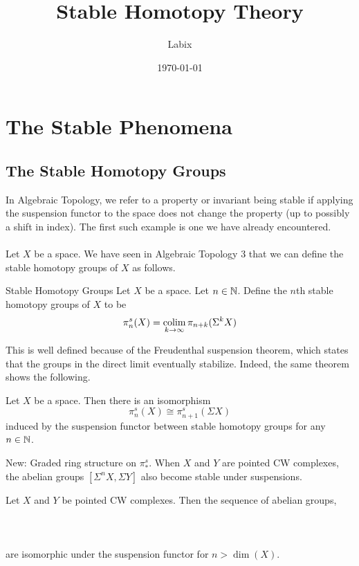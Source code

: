 \documentclass[a4paper]{article}
\title{Stable Homotopy Theory}
\author{Labix}
\date{\today}
\begin{document}
\maketitle
\begin{abstract}
\begin{itemize}
\end{itemize}
\end{abstract}
\pagebreak
\tableofcontents

\pagebreak
\section{The Stable Phenomena}
\subsection{The Stable Homotopy Groups}
In Algebraic Topology, we refer to a property or invariant being stable if applying the suspension functor to the space does not change the property (up to possibly a shift in index). The first such example is one we have already encountered. \\~\\

Let $X$ be a space. We have seen in Algebraic Topology 3 that we can define the stable homotopy groups of $X$ as follows. 

\begin{defn}{Stable Homotopy Groups}{} Let $X$ be a space. Let $n\in\mathbb{N}$. Define the $n$th stable homotopy groups of $X$ to be $$\pi_n^s(X)=\operatorname*{colim}_{k\to\infty}\pi_{n+k}(\Sigma^kX)$$
\end{defn}

This is well defined because of the Freudenthal suspension theorem, which states that the groups in the direct limit eventually stabilize. Indeed, the same theorem shows the following. 

\begin{prp}{}{} Let $X$ be a space. Then there is an isomorphism $$\pi_n^s(X)\cong\pi_{n+1}^s(\Sigma X)$$ induced by the suspension functor between stable homotopy groups for any $n\in\mathbb{N}$. 
\end{prp}

New: Graded ring structure on $\pi_\ast^s$. When $X$ and $Y$ are pointed CW complexes, the abelian groups $[\Sigma^n X,\Sigma Y]$ also become stable under suspensions. 

\begin{thm}{}{} Let $X$ and $Y$ be pointed CW complexes. Then the sequence of abelian groups, \\~\\
\\~\\
are isomorphic under the suspension functor for $n>\dim(X)$. 
\end{thm}
\end{document}
